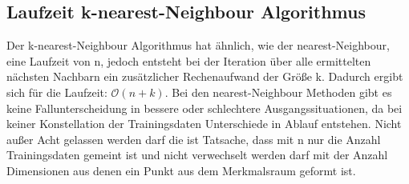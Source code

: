 \documentclass[fontsize=11pt]{scrartcl}
\begin{document}
            \subsection{Laufzeit k-nearest-Neighbour Algorithmus}
                Der k-nearest-Neighbour Algorithmus hat ähnlich, wie der nearest-Neighbour, eine Laufzeit von n, jedoch entsteht bei der Iteration über alle ermittelten nächsten Nachbarn ein zusätzlicher Rechenaufwand der Größe k. Dadurch ergibt sich für die Laufzeit:
                $\mathcal{O}(n+k)$.
                Bei den nearest-Neighbour Methoden gibt es keine Fallunterscheidung in bessere oder schlechtere Ausgangssituationen, da bei keiner Konstellation der Trainingsdaten Unterschiede in Ablauf entstehen.
                Nicht außer Acht gelassen werden darf die ist Tatsache, dass mit n nur die Anzahl Trainingsdaten gemeint ist und nicht verwechselt werden darf mit der Anzahl Dimensionen aus denen ein Punkt aus dem Merkmalsraum geformt ist.


    
    
\end{document}
